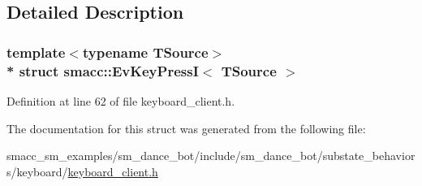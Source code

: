 \subsection{Detailed Description}
\subsubsection*{template$<$typename T\+Source$>$\\*
struct smacc\+::\+Ev\+Key\+Press\+I$<$ T\+Source $>$}



Definition at line 62 of file keyboard\+\_\+client.\+h.



The documentation for this struct was generated from the following file\+:\begin{DoxyCompactItemize}
\item 
smacc\+\_\+sm\+\_\+examples/sm\+\_\+dance\+\_\+bot/include/sm\+\_\+dance\+\_\+bot/substate\+\_\+behaviors/keyboard/\hyperlink{keyboard__client_8h}{keyboard\+\_\+client.\+h}\end{DoxyCompactItemize}
